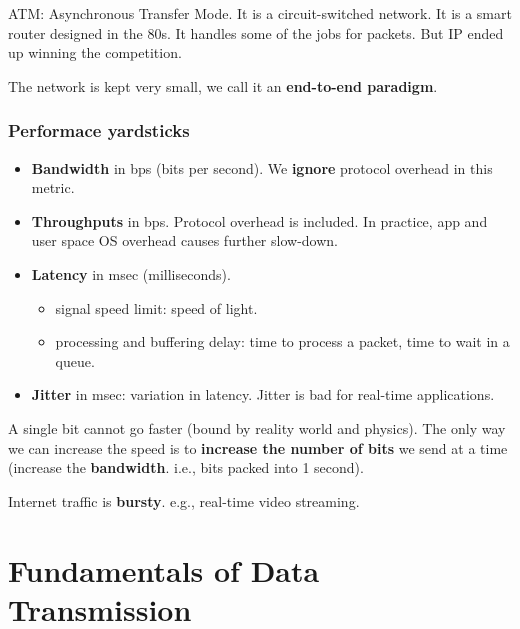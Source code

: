 \documentclass{../../ainote}
\begin{document}
\begin{supp}
    ATM: Asynchronous Transfer Mode. It is a circuit-switched network. It is a smart router designed in the 80s. It handles some of the jobs for packets. But IP ended up winning the competition. 
\end{supp}

The network is kept very small, we call it an \textbf{end-to-end paradigm}.


\subsubsection{Performace yardsticks}
\begin{itemize}[leftmargin=*]
    \item \textbf{Bandwidth} in bps (bits per second). We \textbf{ignore} protocol overhead in this metric.
    \item \textbf{Throughputs} in bps. Protocol overhead is included. In practice, app and user space OS overhead causes further slow-down.
    \item \textbf{Latency} in msec (milliseconds).
        \begin{itemize}
            \item signal speed limit: speed of light.
            \item processing and buffering delay: time to process a packet, time to wait in a queue.
        \end{itemize}
    \item \textbf{Jitter} in msec: variation in latency.  Jitter is bad for real-time applications.
\end{itemize}

A single bit cannot go faster (bound by reality world and physics). The only way we can increase the speed is to \textbf{increase the number of bits} we send at a time (increase the \textbf{bandwidth}. i.e., bits packed into 1 second). 

Internet traffic is \textbf{bursty}. e.g., real-time video streaming.

\newpage

\section{Fundamentals of Data Transmission}
\end{document}
